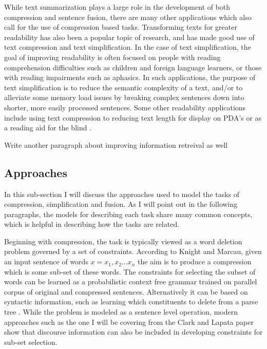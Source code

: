 {While text summarization plays a large role in the development of both compression and sentence fusion, there are many other applications which also call for the use of compression based tasks.  Transforming texts for greater readability has also been a popular topic of research, and has made good use of text compression and text simplification.  In the case of text simplification, the goal of improving readability is often focused on people with reading comprehension difficulties such as children and foreign language learners, or those with reading impairments such as aphasics\citet{Feng2008}. In such applications, the purpose of text simplification is to reduce the semantic complexity of a text, and/or to alleviate some memory load issues by breaking complex sentences down into shorter, more easily processed sentences.  Some other readability applications include using text compression to reducing text length for display on PDA's \citep{Corston-Oliver 2001} or as a reading aid for the blind \citep{Grefenstette 1998}.}
 
{ Write another paragraph about improving information retreival as well}

\subsection{Approaches}
{In this sub-section I will discuss the approaches used to model the tasks of compression, simplification and fusion.  As I will point out in the following paragraphs, the models for describing each task share many common concepts, which is helpful in describing how the tasks are related.  } 

{Beginning with compression, the task is typically viewed as a word deletion problem governed by a set of constraints.  According to Knight and Marcau\citet{KnightMarcau2002}, given an input sentence of words $x= x_{1},x_{2}...x_{n}$ the aim is to produce a compression which is some sub-set of these words.  The constraints for selecting the subset of words can be learned as a probabilistic context free grammar trained on  parallel corpus of original and compressed sentences\citep{KnightMarcau2002}. Alternatively it can be based on syntactic information, such as learning which constituents to delete from a parse tree \citep{ClarkLapata 2008}.  While the problem is modeled as a sentence level operation, modern approaches such as the one I will be covering from the Clark and Lapata \citep{ClarkLapata 2010} paper show that discourse information can also be included in developing constraints for sub-set selection.}

